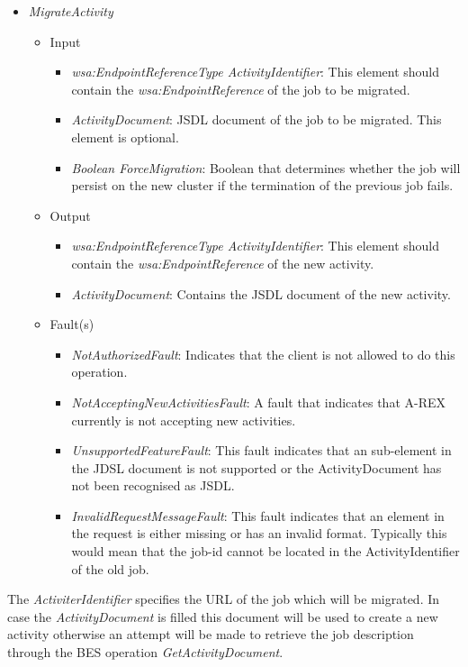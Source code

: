 \documentclass{article}                            %
\begin{document}
\begin{itemize}
\item \emph{MigrateActivity}
\begin{itemize}
\item Input
\begin{itemize}
\item \emph{wsa:EndpointReferenceType ActivityIdentifier}: This 
element should contain the \emph{wsa:EndpointReference} of the job to 
be migrated.
\item \emph{ActivityDocument}: JSDL document of the job to be 
migrated. This element is optional.
\item \emph{Boolean ForceMigration}: Boolean that determines whether 
the job will persist on the new cluster if the termination of the 
previous job fails.
\end{itemize}
\item Output
\begin{itemize}
\item \emph{wsa:EndpointReferenceType ActivityIdentifier}: This 
element should contain the \emph{wsa:EndpointReference} of the new 
activity.
\item \emph{ActivityDocument}: Contains the JSDL document of the new 
activity.
\end{itemize}
\item Fault(s)
\begin{itemize}
\item \emph{NotAuthorizedFault}: Indicates that the client is not allowed
to do this operation.
\item \emph{NotAcceptingNewActivitiesFault}: A fault that indicates that A-REX 
currently is not accepting new activities.
\item \emph{UnsupportedFeatureFault}: This fault indicates that an sub-element in the 
JDSL document is not supported or the ActivityDocument has not been recognised as JSDL. 
\item \emph{InvalidRequestMessageFault}: This fault indicates that an element in the 
request is either missing or has an invalid format. Typically this would mean that 
the job-id cannot be located in the ActivityIdentifier of the old job.
\end{itemize}
\end{itemize}
\end{itemize}

The \emph{ActiviterIdentifier} specifies the URL of the job which will be migrated. In case the 
\emph{ActivityDocument} is filled this document will be used to create a new activity otherwise 
an attempt will be made to retrieve the job description through the BES operation
\emph{GetActivityDocument}.
\end{document}
